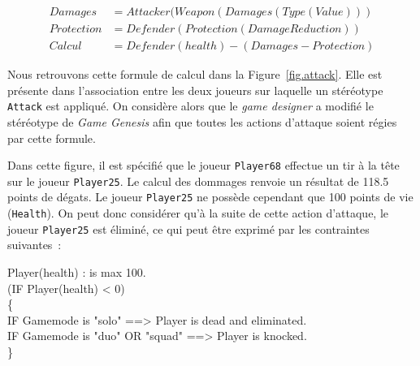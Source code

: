 \begin{equation*}
\begin{split}
Damages& = Attacker(Weapon(Damages(Type(Value)))\\
Protection& = Defender(Protection(DamageReduction))\\
Calcul& = Defender(health) - (Damages - Protection)
\end{split}
\end{equation*}




Nous retrouvons cette formule de calcul dans la Figure~\ref{fig.attack}.
Elle est présente dans l'association entre les deux joueurs sur laquelle un stéréotype \texttt{Attack} est appliqué.
On considère alors que le \emph{game designer} a modifié le stéréotype de \emph{Game Genesis} afin que toutes les actions d'attaque soient régies par cette formule.

Dans cette figure, il est spécifié que le joueur \texttt{Player68} effectue un tir à la tête sur le joueur \texttt{Player25}.
Le calcul des dommages renvoie un résultat de 118.5 points de dégats.
Le joueur \texttt{Player25} ne possède cependant que 100 points de vie (\texttt{Health}).
On peut donc considérer qu'à la suite de cette action d'attaque, le joueur \texttt{Player25} est éliminé,
ce qui peut être exprimé par les contraintes suivantes~:

{
\footnotesize
\begin{framed}
    Player(health) : is max 100.\\
    (IF Player(health) < 0)\\
    \{\\
    IF Gamemode is "solo" ==> Player is dead and eliminated.\\
    IF Gamemode is "duo" OR "squad" ==> Player is knocked.\\
    \}
\end{framed}
}






